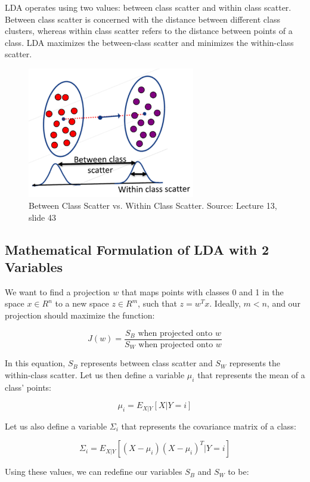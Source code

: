 \documentclass{article}
\begin{document}
LDA operates using two values: between class scatter and within class scatter. Between class scatter is concerned with the distance between different class clusters, whereas within class scatter refers to the distance between points of a class. LDA maximizes the between-class scatter and minimizes the within-class scatter.

\begin{figure}[H]
  \centering
  \includegraphics[width=0.65\textwidth]{between-within-scatters}
  \caption{Between Class Scatter vs. Within Class Scatter. Source: Lecture 13, slide 43}
\end{figure}

\subsection{Mathematical Formulation of LDA with 2 Variables}

We want to find a projection $w$ that maps points with classes 0 and 1 in the space $x \in R^n$ to a new space $z \in R^m$, such that $z = w^{T}x$. Ideally, $m < n$, and our projection should maximize the function: 

$$J(w) = \frac{S_B\text{ when projected onto }w}{S_W\text{ when projected onto }w}$$ 

In this equation, $S_B$ represents between class scatter and $S_W$ represents the within-class scatter. Let us then define a variable $\mu_i$ that represents the mean of a class' points:

$$\mu_i = E_{X|Y}[X|Y=i]$$

Let us also define a variable $\Sigma_i$ that represents the covariance matrix of a class: 

$$\Sigma_i = E_{X|Y}[(X-\mu_i)(X-\mu_i)^T|Y=i]$$

Using these values, we can redefine our variables $S_B$ and $S_W$ to be:
\end{document}
